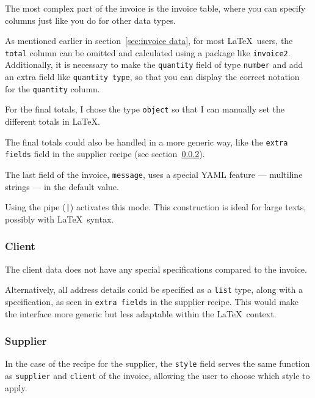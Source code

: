 The most complex part of the invoice is the invoice table, where you can specify columns just like you do for other data types.

As mentioned earlier in section~\ref{sec:invoice data}, for most \LaTeX\ users, the \texttt{total} column can be omitted and calculated using a package like \texttt{invoice2}.
Additionally, it is necessary to make the \texttt{quantity} field of type \texttt{number} and add an extra field like \texttt{quantity type}, so that you can display the correct notation for the \texttt{quantity} column.

For the final totals, I chose the type \texttt{object} so that I can manually set the different totals in \LaTeX.

The final totals could also be handled in a more generic way, like the \texttt{extra fields} field in the supplier recipe (see section~\ref{sec:supplier spec}).

The last field of the invoice, \texttt{message}, uses a special YAML feature — multiline strings — in the default value.

Using the pipe (\texttt{|}) activates this mode.
This construction is ideal for large texts, possibly with \LaTeX\ syntax.

\subsubsection{Client}
The client data does not have any special specifications compared to the invoice.

Alternatively, all address details could be specified as a \texttt{list} type, along with a specification, as seen in \texttt{extra fields} in the supplier recipe.
This would make the interface more generic but less adaptable within the \LaTeX\ context.

\subsubsection{Supplier}\label{sec:supplier spec}
In the case of the recipe for the supplier, the \texttt{style} field serves the same function as \texttt{supplier} and \texttt{client} of the invoice, allowing the user to choose which style to apply.


